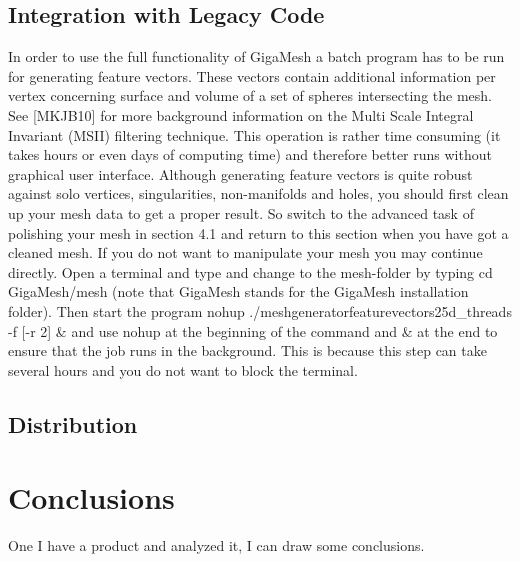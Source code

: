 \documentclass{article}
\begin{document}
\subsection{Integration with Legacy Code}
In order to use the full functionality of GigaMesh a batch program has to be run for generating feature vectors. These vectors contain additional information per vertex concerning surface and volume of a set of spheres intersecting the mesh. See [MKJB10] for more background information on the Multi Scale Integral Invariant (MSII) filtering technique. This operation is rather time consuming (it takes hours or even days of computing time) and therefore better runs without graphical user interface. Although generating feature vectors is quite robust against solo vertices, singularities, non-manifolds and holes, you should first clean up your mesh data to get a proper result. So switch to the advanced task of polishing your mesh in section 4.1 and return to this section when you have got a cleaned mesh. If you do not want to manipulate your mesh you may continue directly. Open a terminal and type and change to the mesh-folder by typing cd GigaMesh/mesh (note that GigaMesh stands for the GigaMesh installation folder). Then start the program 
nohup ./meshgeneratorfeaturevectors25d\_threads -f [-r 2] \& 
and use nohup at the beginning of the command and \& at the end to ensure that the job runs in the background. This is because this step can take several hours and you do not want to block the terminal.~\cite[p.~19]{Giga17}
\subsection{Distribution}
\section{Conclusions}
One I have a product and analyzed it, I can draw some conclusions.
\printindex
{}

\end{document}
